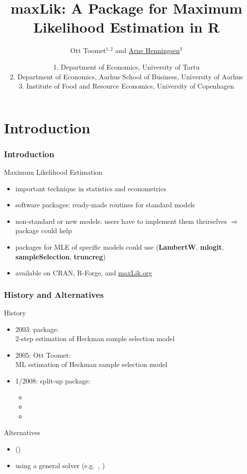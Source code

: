 \documentclass{beamer}
\title[maxLik: Maximum Likelihood in \R]{
   maxLik: A Package for Maximum Likelihood Estimation in \textsf{R}}
\author[Arne Henningsen]{Ott Toomet$^{1,2}$ and \underline{Arne Henningsen}$^3$}
\date{\footnotesize{
1. Department of Economics, University of Tartu\\
2. Department of Economics, Aarhus School of Business, University of Aarhus\\
3. Institute of Food and Resource Economics, University of Copenhagen}}
\begin{document}
\begin{frame}[plain]
\setlength{\textwidth}{1.15\textwidth}
\titlepage
\end{frame}

\section{Introduction}
\begin{frame}
\frametitle{Introduction}
Maximum Likelihood Estimation
\begin{itemize}
\item important technique in statistics and econometrics
\item software packages: ready-made routines for standard models
\item non-standard or new models: users have to implement them theirselves
   $\Rightarrow$  package could help
\item packages for MLE of specific models could use 
   (\textbf{LambertW}, \textbf{mlogit}, \textbf{sampleSelection},
   \textbf{truncreg})
\item {} available on CRAN, R-Forge, and \url{maxLik.org}
\end{itemize}
\end{frame}

\begin{frame}
\frametitle{History and Alternatives}
History
\begin{itemize}
\item 2003:  package:\\
   2-step estimation of Heckman sample selection model
\item 2005: Ott Toomet:\\
   ML estimation of Heckman sample selection model
\item 1/2008: split-up  package:
   \begin{itemize}
   \item {}
   \item {}
   \item {}
   \end{itemize}
\end{itemize}
\vspace*{1ex}
Alternatives
\begin{itemize}
\item {} ()
\item using a general solver
   (e.g.\ , )
\end{itemize}
\end{frame}
\end{document}
